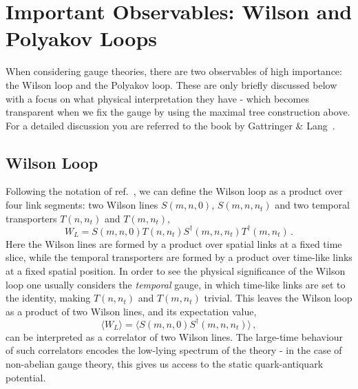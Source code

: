 \documentclass[11pt]{article}
\newcommand{\sidefact}[1]{\marginnote{\footnotesize\textcolor{green!50!black}{#1}}}
\theoremstyle{definition}
\begin{document}
\section{Important Observables: Wilson and Polyakov Loops}
When considering gauge theories, there are two observables of high importance: the Wilson loop and the Polyakov loop. These are only briefly discussed below with a focus on what physical interpretation they have - which becomes transparent when we fix the gauge by using the maximal tree construction above. For a detailed discussion you are referred to the book by Gattringer \& Lang~\cite{gattringer2010qcd}.

\subsection*{Wilson Loop}
Following the notation of ref.~\cite{gattringer2010qcd}, we can define the 
Wilson loop as a product over four link segments\sidefact{A trace over the 
product is required for non-abelian gauge fields.}: two Wilson lines 
$S(m,n,0)$, $S(m,n,n_t)$ and two temporal transporters $T(n,n_t)$ and 
$T(m,n_t)$,
\begin{equation}\label{eqn:wilson_loop}
    W_L = S(m,n,0) T(n,n_t) S^{\dagger}(m,n,n_t) T^{\dagger}(m,n_t)\,.
\end{equation}
Here the Wilson lines are formed by a product over spatial links at a fixed 
time slice, while the temporal transporters are formed by a product over 
time-like links at a fixed spatial position. In order to see the physical 
significance of the Wilson loop one usually considers the \textit{temporal} 
gauge, in which time-like links are set to the identity, making $T(n,n_t)$ 
and $T(m,n_t)$ trivial. This leaves the Wilson loop as a product of two 
Wilson lines, and its expectation value,
\begin{equation}
\langle W_L \rangle = \langle  S(m,n,0) S^{\dagger}(m,n,n_t) \rangle \,,
\end{equation}
can be interpreted as a correlator of two Wilson lines. The large-time 
behaviour of such correlators encodes the low-lying spectrum of the theory - 
in the case of non-abelian gauge theory, this gives us access to the static 
quark-antiquark potential.
\end{document}
